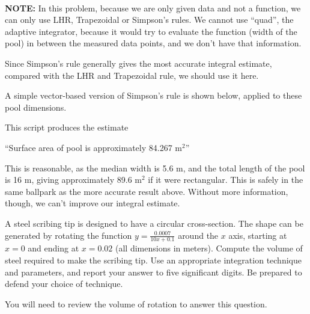 ~~~

\begin{Solution}
  {\bf NOTE: } In this problem, because we are only given data and not
  a function, we can only use LHR, Trapezoidal or Simpson's rules. We
  cannot use ``quad'', the adaptive integrator, because it would try
  to evaluate the function (width of the pool) in between the measured
  data points, and we don't have that information.

  Since Simpson's rule generally gives the most accurate integral
  estimate, compared with the LHR and Trapezoidal rule, we should use
  it here.

  A simple vector-based version of Simpson's rule is shown below,
  applied to these pool dimensions.




This script produces the estimate

``Surface area of pool is approximately 84.267 m$^2$''

This is reasonable, as the median width is 5.6 m, and the total length
of the pool is 16 m, giving approximately 89.6 m$^2$ if it were
rectangular.  This is safely in the same ballpark as the more accurate
result above.  Without more information, though, we can't improve our
integral estimate.

\end{Solution}




\item A steel scribing tip is designed to have a circular
  cross-section. The shape can be generated by rotating the function
  $\displaystyle y = \frac{0.0007}{10 x + 0.1}$ around the $x$ axis, starting at
  $x=0$ and ending at $x=0.02$ (all dimensions in meters).  Compute
  the volume of steel required to make the scribing tip.  Use an
  appropriate integration technique and parameters, and report your
  answer to five significant digits.  Be prepared to defend your
  choice of technique.

  You will need to review the volume of rotation to answer this
  question.

